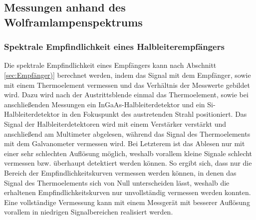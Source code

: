 \documentclass[a4paper,twoside,final]{article}
\begin{document}
\subsection{Messungen anhand des Wolframlampenspektrums}
\subsubsection{Spektrale Empfindlichkeit eines Halbleiterempfängers}
Die spektrale Empfindlichkeit eines Empfängers kann nach Abschnitt \ref{sec:Empfänger)} berechnet werden, indem das Signal mit dem Empfänger, sowie mit einem Thermoelement vermessen  und das Verhältnis der Messwerte gebildet wird. Dazu wird nach der Austrittsblende einmal das Thermoelement, sowie bei anschließenden Messungen ein InGaAs-Halbleiterdetektor und ein Si-Halbleiterdetektor in den Fokuspunkt des austretenden Strahl positioniert. Das Signal der Halbleiterdetektoren wird mit einem Verstärker verstärkt und anschließend am Multimeter abgelesen, während das Signal des Thermoelements mit dem Galvanometer vermessen wird. Bei Letzterem ist das Ablesen nur mit einer sehr schlechten Auflösung möglich, weshalb vorallem kleine Signale schlecht vermessen bzw. überhaupt detektiert werden können. So ergibt sich, dass nur die Bereich der Empfindlichkeitskurven vermessen werden können, in denen das Signal des Thermoelements sich von Null unterscheiden lässt, weshalb die erhaltenen Empfindlichkeitskurven nur unvollständig vermessen werden konnten. Eine vollständige Vermessung kann mit einem Messgerät mit besserer Auflösung vorallem in niedrigen Signalbereichen realisiert werden.





%
\end{document}
